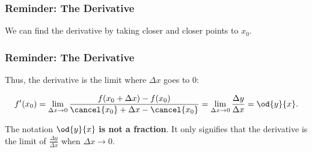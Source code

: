 \begin{frame}
	\frametitle{Reminder: The Derivative}
	\centering
	
	We can find the derivative by taking closer and closer points to $x_{0}$.
	
\end{frame}

\begin{frame}
	\frametitle{Reminder: The Derivative}
	Thus, the derivative is the limit where $\Delta x$ goes to $0$:
	\begin{presentation_definition}
		\begin{equation*}
			f'(x_{0}) = \lim\limits_{\Delta x\rightarrow0} \frac{f(x_{0}+\Delta x) - f(x_{0})}{\cancel{x_{0}} + \Delta x - \cancel{x_{0}}} = \lim\limits_{\Delta x\rightarrow0} \frac{\Delta y}{\Delta x} = \od{y}{x}.
		\end{equation*}
	\end{presentation_definition}
	\begin{presentation_note}
		The notation $\od{y}{x}$ \textbf{is not a fraction}. It only signifies that the derivative is the limit of $\frac{\Delta y}{\Delta x}$ when $\Delta x\rightarrow0$.
	\end{presentation_note}
\end{frame}

